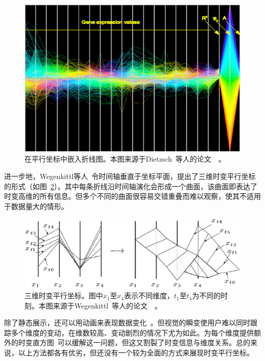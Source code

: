 \documentclass[12pt,twocolumn]{article}
\begin{document}
\begin{figure}[!htb]
\centering
\includegraphics[width=0.9\linewidth]{images/PC_Data_Time1.eps}
\caption{\label{fig:PC_Data_Time1}在平行坐标中嵌入折线图。本图来源于Dietzsch~等人的论文~\citep{dietzsch2009spray}~。
}
\end{figure}

进一步地，Wegenkittl等人~\citep{wegenkittl1997visualizing}令时间轴垂直于坐标平面，提出了三维时变平行坐标的形式（如图~\ref{fig:PC_Data_Time2}）。其中每条折线沿时间轴演化会形成一个曲面，该曲面即表达了时变高维的所有信息。但多个不同的曲面很容易交错重叠而难以观察，使其不适用于数据量大的情形。

\begin{figure}[!htb]
\centering
\includegraphics[width=1.0\linewidth]{images/PC_Data_Time2.eps}
\caption{\label{fig:PC_Data_Time2}三维时变平行坐标。图中$x_1$至$x_4$表示不同维度，$t_1$至$t_4$为不同的时刻。本图来源于Wegenkittl~等人的论文~\citep{wegenkittl1997visualizing}~。
}
\end{figure}

除了静态展示，还可以用动画来表现数据变化~\citep{barlow2004animator}。但视觉的瞬变使用户难以同时跟踪多个维度的变动，在维数较高、变动剧烈的情况下尤为如此。为每个维度提供额外的时变直方图~\citep{blaas2008extensions}可以缓解这一问题，但这又割裂了时变信息与维度关系。总的来说，以上方法都各有优劣，但还没有一个较为全面的方式来展现时变平行坐标。
\end{document}
